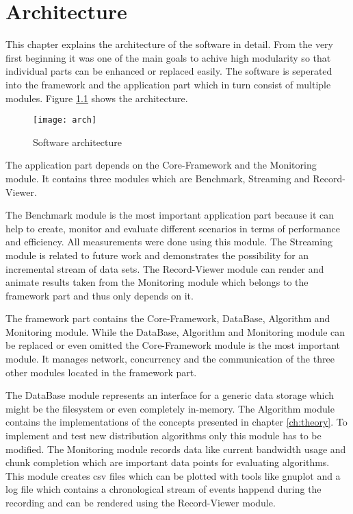 \chapter{Architecture}
\label{ch:arch}

This chapter explains the architecture of the software in detail. From the very first beginning it was one of the main goals to achive high modularity so that individual parts can be enhanced or replaced easily. The software is seperated into the framework and the application part which in turn consist of multiple modules. Figure \ref{fig:arch} shows the architecture.

\vspace{1cm}

\begin{figure}[H]
\centering
\texttt{[image: arch]}
\caption{Software architecture}
\label{fig:arch}
\end{figure}

\clearpage

The application part depends on the Core-Framework and the Monitoring module. It contains three modules which are Benchmark, Streaming and Record-Viewer. 

The Benchmark module is the most important application part because it can help to create, monitor and evaluate different scenarios in terms of performance and efficiency. All measurements were done using this module. The Streaming module is related to future work and demonstrates the possibility for an incremental stream of data sets. The Record-Viewer module can render and animate results taken from the Monitoring module which belongs to the framework part and thus only depends on it.

The framework part contains the Core-Framework, DataBase, Algorithm and Monitoring module. While the DataBase, Algorithm and Monitoring module can be replaced or even omitted the Core-Framework module is the most important module. It manages network, concurrency and the communication of the three other modules located in the framework part. 

The DataBase module represents an interface for a generic data storage which might be the filesystem or even completely in-memory. The Algorithm module contains the implementations of the concepts presented in chapter \ref{ch:theory}. To implement and test new distribution algorithms only this module has to be modified. The Monitoring module records data like current bandwidth usage and chunk completion which are important data points for evaluating algorithms. This module creates csv files which can be plotted with tools like gnuplot and a log file which contains a chronological stream of events happend during the recording and can be rendered using the Record-Viewer module.

